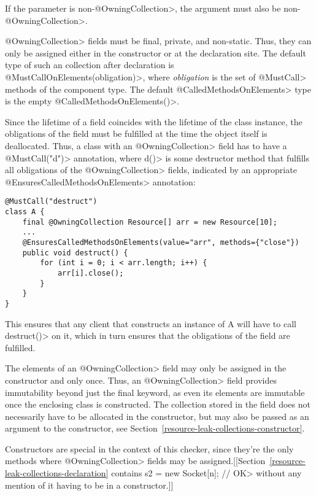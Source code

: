 If the parameter is non-\<@OwningCollection>, the argument must also be non-\<@OwningCollection>.

\<@OwningCollection> fields must be final, private, and non-static. Thus, they can only be assigned either in the constructor or at the declaration site.
The default type of such an collection after declaration is \<@MustCallOnElements(obligation)>, where \textit{obligation} is the set of \<@MustCall> methods of the component type. The default \<@CalledMethodsOnElements> type is the empty \<@CalledMethodsOnElements({})>.

Since the lifetime of a field coincides with the lifetime of the class instance, the obligations of the field must be fulfilled at the time the object itself is deallocated.
Thus, a class with an \<@OwningCollection> field has to have a \<@MustCall("d")> annotation, where \<d()> is some destructor method that fulfills all obligations of the \<@OwningCollection> fields, indicated by an appropriate \<@EnsuresCalledMethodsOnElements> annotation:

\begin{verbatim}
@MustCall("destruct")
class A {
    final @OwningCollection Resource[] arr = new Resource[10];
    ...
    @EnsuresCalledMethodsOnElements(value="arr", methods={"close"})
    public void destruct() {
        for (int i = 0; i < arr.length; i++) {
            arr[i].close();
        }
    }
}
\end{verbatim}

This ensures that any client that constructs an instance of A will have to call \<destruct()> on it, which in turn ensures that the obligations of the field are fulfilled.

The elements of an \<@OwningCollection> field may only be assigned in the constructor and only once. Thus, an \<@OwningCollection> field provides immutability beyond just the final keyword, as even its elements are immutable once the enclosing class is constructed. The collection stored in the field does not necessarily have to be allocated in the constructor, but may also be passed as an argument to the constructor, see Section~\ref{resource-leak-collections-constructor}.



Constructors are special in the context of this checker, since they're the
only methods where \<@OwningCollection> fields may be
assigned.[[Section~\ref{resource-leak-collections-declaration} contains
\<s2 = new Socket[n]; // OK> without any mention of it having to be in a constructor.]]

